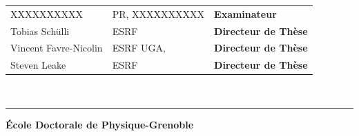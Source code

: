 \documentclass[12pt]{book}
\begin{document}
\begin{titlepage}
\begin{center}
\begin{tabular}{lll}
		XXXXXXXXXX & PR, XXXXXXXXXX & \textbf{Examinateur} \\
		
		Tobias Sch\"ulli &  ESRF & \textbf{Directeur de Thèse}\\
		Vincent Favre-Nicolin &  ESRF UGA, & \textbf{Directeur de Thèse}\\
		Steven Leake &  ESRF & \textbf{Directeur de Thèse}

	\end{tabular}\\[1cm]
\end{center}
\hrule

{\small \bfseries
École Doctorale de Physique-Grenoble}

\newpage
\end{titlepage}



\pagestyle{fancy}

\fancyhead{}

\renewcommand{\chaptermark}[1]{\markboth{\textsc{#1}}{}}

\frontmatter



%
%


\tableofcontents
\clearpage





\setlength{\parskip}{.7em}

\titlespacing*{\section}{0pt}{.9em}{.8em}
\renewcommand{\baselinestretch}{1.1}



\end{document}
